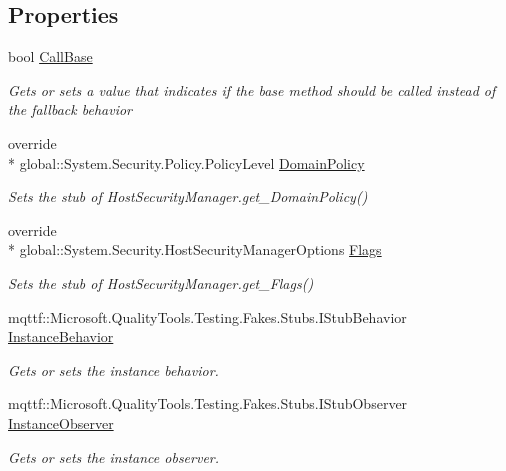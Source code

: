 \subsection*{Properties}
\begin{DoxyCompactItemize}
\item 
bool \hyperlink{class_system_1_1_security_1_1_fakes_1_1_stub_host_security_manager_aecef38ec41818f1e2f150bc37762e745}{Call\-Base}
\begin{DoxyCompactList}\small\item\em Gets or sets a value that indicates if the base method should be called instead of the fallback behavior\end{DoxyCompactList}\item 
override \\*
global\-::\-System.\-Security.\-Policy.\-Policy\-Level \hyperlink{class_system_1_1_security_1_1_fakes_1_1_stub_host_security_manager_ac3b130d914d080ec8638d75eaf1cdd08}{Domain\-Policy}
\begin{DoxyCompactList}\small\item\em Sets the stub of Host\-Security\-Manager.\-get\-\_\-\-Domain\-Policy()\end{DoxyCompactList}\item 
override \\*
global\-::\-System.\-Security.\-Host\-Security\-Manager\-Options \hyperlink{class_system_1_1_security_1_1_fakes_1_1_stub_host_security_manager_a1de097aee42b9b228654efed758bc459}{Flags}
\begin{DoxyCompactList}\small\item\em Sets the stub of Host\-Security\-Manager.\-get\-\_\-\-Flags()\end{DoxyCompactList}\item 
mqttf\-::\-Microsoft.\-Quality\-Tools.\-Testing.\-Fakes.\-Stubs.\-I\-Stub\-Behavior \hyperlink{class_system_1_1_security_1_1_fakes_1_1_stub_host_security_manager_aca1358a3fdc6bcbaac93e4b5616a0cfe}{Instance\-Behavior}
\begin{DoxyCompactList}\small\item\em Gets or sets the instance behavior.\end{DoxyCompactList}\item 
mqttf\-::\-Microsoft.\-Quality\-Tools.\-Testing.\-Fakes.\-Stubs.\-I\-Stub\-Observer \hyperlink{class_system_1_1_security_1_1_fakes_1_1_stub_host_security_manager_a2d4010cc76435c6f54da67d1a8be3dbc}{Instance\-Observer}
\begin{DoxyCompactList}\small\item\em Gets or sets the instance observer.\end{DoxyCompactList}\end{DoxyCompactItemize}


